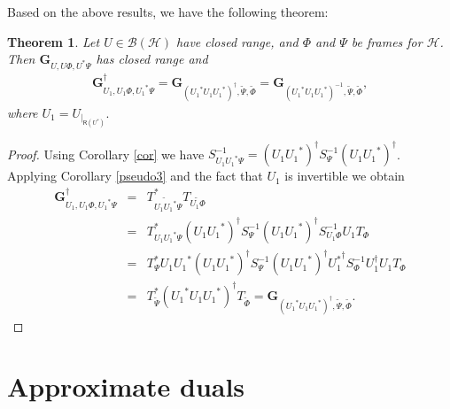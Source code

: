 \documentclass{birkjour}
\newtheorem{thm}{Theorem}[section]
\theoremstyle{definition}
\theoremstyle{remark}
\numberwithin{equation}{section}
\newcommand{\range}[1]{\mathsf{R}\left( #1 \right)}
\def\Hil{\mathcal{H}}
\newcommand{\BL}[1]{
{\mathcal B} \left( #1 \right)
}
\begin{document}
Based on the above results, we have the following theorem: 
\begin{thm}
Let $U\in\BL{\Hil}$ have closed range, and $\Phi$ and $\Psi$ be
frames for $\Hil$. Then $\mathbf{G}_{U,U\Phi,U^*\Psi}$ has closed
range and
\begin{eqnarray*}
\mathbf{G}_{U_1,U_1\Phi,{U_1}^*\Psi}^{\dagger}=\mathbf{G}_{\left({U_1}^*U_1{U_1}^*\right)^{\dagger},\widetilde{\Psi},\widetilde{\Phi}}=\mathbf{G}_{\left({U_1}^*U_1{U_1}^*\right)^{-1},\widetilde{\Psi},\widetilde{\Phi}},
\end{eqnarray*}
where $U_1=U_{|_{\range{U^*}}}.$
\end{thm}
\begin{proof}
Using Corollary \ref{cor} we have
$S_{U_1{U_1}^*\Psi}^{-1}=\left(U_1{U_1}^*\right)^{\dagger}S_{\Psi}^{-1}
\left(U_1{U_1}^*\right)^{\dagger}$. Applying Corollary \ref{pseudo3}  and the fact that $U_1$ is invertible we
obtain
\begin{eqnarray*}
\mathbf{G}_{U_1,U_1\Phi,{U_1}^*\Psi}^{\dagger}&=&
T_{\widetilde{U_1{U_1}^*}\Psi}^*T_{\widetilde{U_1 \Phi}}\\
&=&T_{U_1{U_1}^*\Psi}^*\left(U_1{U_1}^*\right)^{\dagger}S_{\Psi}^{-1}
\left(U_1{U_1}^*\right)^{\dagger}S_{U_1 \Phi}^{-1} U_1T_{\Phi}\\
&=&T_{\Psi}^* U_1{U_1}^*\left( U_1{U_1}^* \right)^{\dagger}S_{\Psi}^{-1}
\left( U_1{U_1}^*\right)^{\dagger}{ U_1^*}^{\dagger}S_{\Phi}^{-1} U_1^{\dagger} U_1 T_{\Phi}\\
&=&T_{\widetilde{\Psi}}^*\left({U_1}^*U_1{U_1}^*\right)^{\dagger}T_{\widetilde{\Phi}}=
\mathbf{G}_{\left({U_1}^*U_1{U_1}^*\right)^{\dagger},\widetilde{\Psi},\widetilde{\Phi}}.
\end{eqnarray*}


\end{proof}


\section{Approximate duals} \label{sec.apprdual}
\end{document}
